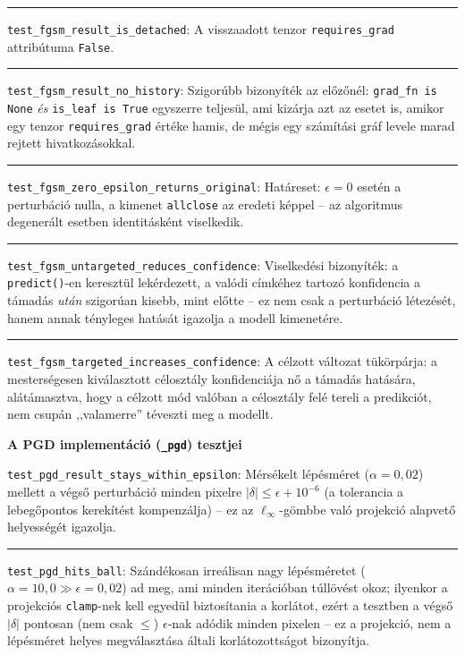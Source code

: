 \medskip
\noindent\rule{\linewidth}{0.3pt}

\medskip
\noindent\texttt{test\_fgsm\_result\_is\_detached}: A visszaadott tenzor \texttt{requires\_grad} attribútuma 
\texttt{False}. 

\medskip
\noindent\rule{\linewidth}{0.3pt}

\medskip
\noindent\texttt{test\_fgsm\_result\_no\_history}: Szigorúbb bizonyíték az előzőnél: \texttt{grad\_fn is None} 
\emph{és} \texttt{is\_leaf is True} egyszerre teljesül, ami kizárja azt az esetet is, amikor egy tenzor \texttt{requires\_grad} 
értéke hamis, de mégis egy számítási gráf levele marad rejtett hivatkozásokkal. 

\medskip
\noindent\rule{\linewidth}{0.3pt}

\medskip
\noindent\texttt{test\_fgsm\_zero\_epsilon\_returns\_original}: Határeset: $\epsilon=0$ esetén a perturbáció nulla, a 
kimenet \texttt{allclose} az eredeti képpel -- az algoritmus degenerált esetben identitásként viselkedik. 

\medskip
\noindent\rule{\linewidth}{0.3pt}

\medskip
\noindent\texttt{test\_fgsm\_untargeted\_reduces\_confidence}: Viselkedési bizonyíték: a 
\texttt{predict()}-en keresztül lekérdezett, a valódi címkéhez tartozó konfidencia a támadás \emph{után} szigorúan kisebb, mint 
előtte -- ez nem csak a perturbáció létezését, hanem annak tényleges hatását igazolja a modell kimenetére. 

\medskip
\noindent\rule{\linewidth}{0.3pt}

\medskip
\noindent\texttt{test\_fgsm\_targeted\_increases\_confidence}: A célzott változat tükörpárja: a 
mesterségesen kiválasztott célosztály konfidenciája nő a támadás hatására, alátámasztva, hogy a célzott mód valóban a célosztály 
felé tereli a predikciót, nem csupán ,,valamerre'' téveszti meg a modellt. 

\bigskip
\noindent\textbf{A PGD implementáció (\texttt{\_pgd}) tesztjei}

\medskip
\noindent\texttt{test\_pgd\_result\_stays\_within\_epsilon}: Mérsékelt lépésméret ($\alpha=0{,}02$) mellett a végső 
perturbáció minden pixelre $|\delta| \leq \epsilon + 10^{-6}$ (a tolerancia a lebegőpontos kerekítést kompenzálja) -- ez az 
$\ell_\infty$-gömbbe való projekció alapvető helyességét igazolja. 

\medskip
\noindent\rule{\linewidth}{0.3pt}

\medskip
\noindent\texttt{test\_pgd\_hits\_ball}: Szándékosan irreálisan nagy lépésméretet ($\alpha=10{,}0 \gg 
\epsilon=0{,}02$) ad meg, ami minden iterációban túllövést okoz; ilyenkor a projekciós \texttt{clamp}-nek kell egyedül 
biztosítania a korlátot, ezért a tesztben a végső $|\delta|$ pontosan (nem csak $\leq$) $\epsilon$-nak adódik minden pixelen -- 
ez a projekció, nem a lépésméret helyes megválasztása általi korlátozottságot bizonyítja. 

